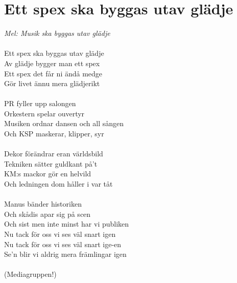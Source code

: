 \documentclass[a5paper,15pt]{article}
\begin{document}
\section{Ett spex ska byggas utav glädje}
\emph{Mel: Musik ska byggas utav glädje}\\
\\
Ett spex ska byggas utav glädje\\
Av glädje bygger man ett spex\\
Ett spex det får ni ändå medge\\
Gör livet ännu mera glädjerikt\\
\\
PR fyller upp salongen\\
Orkestern spelar ouvertyr\\
Musiken ordnar dansen och all sången\\
Och KSP maskerar, klipper, syr\\
\\
Dekor förändrar eran världsbild\\
Tekniken sätter guldkant på't\\
KM:s mackor gör en helvild\\
Och ledningen dom håller i var tåt\\
\\
Manus bänder historiken\\
Och skådis apar sig på scen\\
Och sist men inte minst har vi publiken\\
Nu tack för oss vi ses väl snart igen\\
Nu tack för oss vi ses väl snart ige-en\\
Se'n blir vi aldrig mera främlingar igen\\
\\
(Mediagruppen!)\\
\\

\setcounter{section}{0}
\renewcommand{\thesection}{P\arabic{section}}
\end{document}
